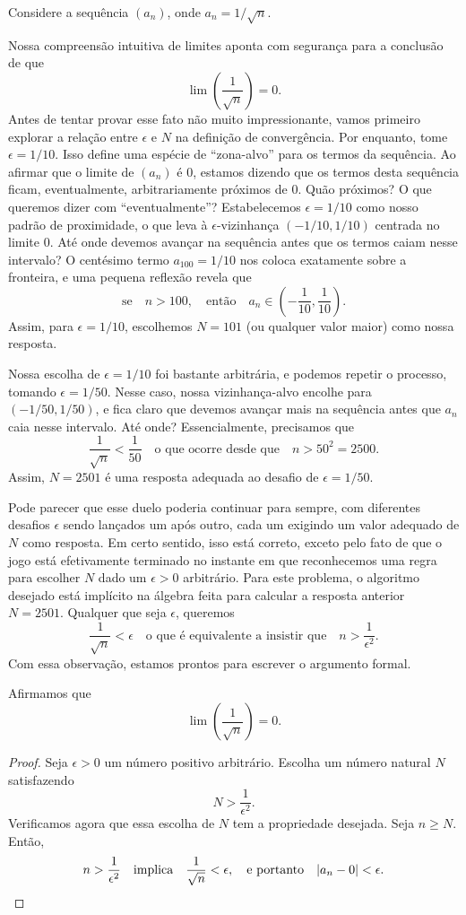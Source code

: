 \begin{example}\label{exmpl:2-2-5}
Considere a sequência $(a_n)$, onde $a_n = 1/\sqrt{n}$.

Nossa compreensão intuitiva de limites aponta com segurança para a conclusão de que
\[
\lim \left( \frac{1}{\sqrt{n}} \right) = 0.
\]
Antes de tentar provar esse fato não muito impressionante, vamos primeiro explorar a relação entre $\epsilon$ e $N$ na definição de convergência. Por enquanto, tome $\epsilon = 1/10$. Isso define uma espécie de ``zona-alvo'' para os termos da sequência. Ao afirmar que o limite de $(a_n)$ é $0$, estamos dizendo que os termos desta sequência ficam, eventualmente, arbitrariamente próximos de $0$. Quão próximos? O que queremos dizer com ``eventualmente''? Estabelecemos $\epsilon = 1/10$ como nosso padrão de proximidade, o que leva à $\epsilon$-vizinhança $(-1/10, 1/10)$ centrada no limite $0$. Até onde devemos avançar na sequência antes que os termos caiam nesse intervalo? O centésimo termo $a_{100} = 1/10$ nos coloca exatamente sobre a fronteira, e uma pequena reflexão revela que
\[
\text{se} \quad n > 100, \quad \text{então} \quad a_n \in \left( -\frac{1}{10}, \frac{1}{10} \right).
\]
Assim, para $\epsilon = 1/10$, escolhemos $N = 101$ (ou qualquer valor maior) como nossa resposta.

Nossa escolha de $\epsilon = 1/10$ foi bastante arbitrária, e podemos repetir o processo, tomando $\epsilon = 1/50$. Nesse caso, nossa vizinhança-alvo encolhe para $(-1/50, 1/50)$, e fica claro que devemos avançar mais na sequência antes que $a_n$ caia nesse intervalo. Até onde? Essencialmente, precisamos que
\[
\frac{1}{\sqrt{n}} < \frac{1}{50} \quad \text{o que ocorre desde que} \quad n > 50^2 = 2500.
\]
Assim, $N = 2501$ é uma resposta adequada ao desafio de $\epsilon = 1/50$.

Pode parecer que esse duelo poderia continuar para sempre, com diferentes desafios $\epsilon$ sendo lançados um após outro, cada um exigindo um valor adequado de $N$ como resposta. Em certo sentido, isso está correto, exceto pelo fato de que o jogo está efetivamente terminado no instante em que reconhecemos uma regra para escolher $N$ dado um $\epsilon > 0$ arbitrário. Para este problema, o algoritmo desejado está implícito na álgebra feita para calcular a resposta anterior $N = 2501$. Qualquer que seja $\epsilon$, queremos
\[
\frac{1}{\sqrt{n}} < \epsilon \quad \text{o que é equivalente a insistir que} \quad n > \frac{1}{\epsilon^2}.
\]
Com essa observação, estamos prontos para escrever o argumento formal.

Afirmamos que
\[
\lim \left( \frac{1}{\sqrt{n}} \right) = 0.
\]

\begin{proof}
Seja $\epsilon > 0$ um número positivo arbitrário. Escolha um número natural $N$ satisfazendo
\[
N > \frac{1}{\epsilon^2}.
\]
Verificamos agora que essa escolha de $N$ tem a propriedade desejada. Seja $n \geq N$. Então,
\[
n > \frac{1}{\epsilon^2} \quad \text{implica} \quad \frac{1}{\sqrt{n}} < \epsilon, \quad \text{e portanto} \quad |a_n - 0| < \epsilon. \qedhere
\]
\end{proof}
\end{example}

